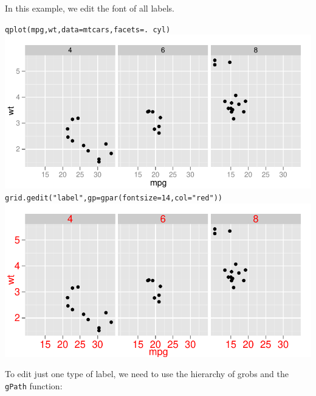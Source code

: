 In this example, we edit the font of all labels.

\begin{alltt}
qplot(mpg, wt, data=mtcars, facets = . ~ cyl)
\includegraphics[scale=0.5]{grid1}
grid.gedit("label", gp=gpar(fontsize=14, col="red"))
\includegraphics[scale=0.5]{grid2}
\end{alltt}

To edit just one type of label, we need to use the hierarchy of grobs and the {\tt gPath} function:

